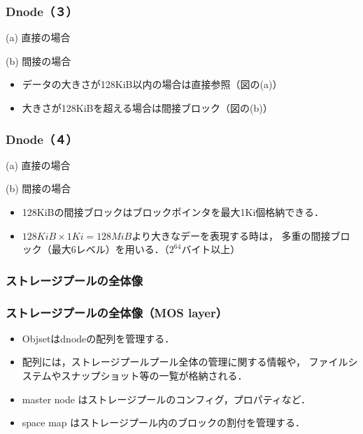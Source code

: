 \documentclass[unicode]{beamer}                   %
\begin{document}
\begin{frame}[fragile]
  \frametitle{Dnode（３）}
  \begin{minipage}{0.49\columnwidth}
    \centerline{(a) 直接の場合}
  \end{minipage}
  \begin{minipage}{0.49\columnwidth}
    \centerline{(b) 間接の場合}
  \end{minipage}
  \begin{itemize}
  \item データの大きさが128KiB以内の場合は直接参照（図の(a)）
  \item 大きさが128KiBを超える場合は間接ブロック（図の(b)）
  \end{itemize}
  \vfill
\end{frame}

\begin{frame}[fragile]
  \frametitle{Dnode（４）}
  \begin{minipage}{0.49\columnwidth}
    \centerline{(a) 直接の場合}
  \end{minipage}
  \begin{minipage}{0.49\columnwidth}
    \centerline{(b) 間接の場合}
  \end{minipage}
  \begin{itemize}
  \item 128KiBの間接ブロックはブロックポインタを最大1Ki個格納できる．
  \item $128KiB \times 1Ki = 128MiB$より大きなデーを表現する時は，
    多重の間接ブロック（最大6レベル）を用いる．（$2^{64}$バイト以上）
  \end{itemize}
  \vfill
\end{frame}

\begin{frame}[fragile]
  \frametitle{ストレージプールの全体像}
  \vfill
\end{frame}

\begin{frame}[fragile]
  \frametitle{ストレージプールの全体像（MOS layer）}
  \begin{itemize}
  \item Objsetはdnodeの配列を管理する．
  \item 配列には，ストレージプールプール全体の管理に関する情報や，
    ファイルシステムやスナップショット等の一覧が格納される．
  \item master node はストレージプールのコンフィグ，プロパティなど．
  \item space map はストレージプール内のブロックの割付を管理する．
  \end{itemize}
  \vfill
\end{frame}
\end{document}
